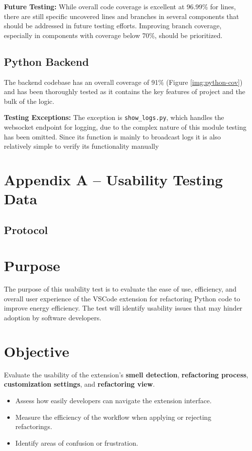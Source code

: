 \documentclass[12pt, titlepage]{article}
\begin{document}
\noindent \textbf{Future Testing:} While overall code coverage is excellent at 96.99\% for lines, there are still specific uncovered lines and branches in several components that should be addressed in future testing efforts. Improving branch coverage, especially in components with coverage below 70\%, should be prioritized.
\subsection{Python Backend}
The backend codebase has an overall coverage of 91\% (Figure
\ref{img:python-cov}) and has been thoroughly tested as it contains
the key features of project and the bulk of the logic. 

\noindent \textbf{Testing Exceptions:} The exception
is \texttt{show\_logs.py}, which handles the websocket endpoint for
logging, due to the complex nature of this module testing has been
omitted. Since its function is mainly to broadcast logs it is also
relatively simple to verify its functionality manually\\

\newpage
\section*{Appendix A -- Usability Testing Data} \label{appendix:usability}

\subsection*{Protocol}

\section*{Purpose}
The purpose of this usability test is to evaluate the ease of use,
efficiency, and overall user experience of the VSCode extension for
refactoring Python code to improve energy efficiency. The test will
identify usability issues that may hinder adoption by software developers.

\section*{Objective}
Evaluate the usability of the extension's \textbf{smell detection},
\textbf{refactoring process}, \textbf{customization settings}, and
\textbf{refactoring view}.

\begin{itemize}
  \item Assess how easily developers can navigate the extension interface.
  \item Measure the efficiency of the workflow when applying or
    rejecting refactorings.
  \item Identify areas of confusion or frustration.
\end{itemize}
\end{document}
